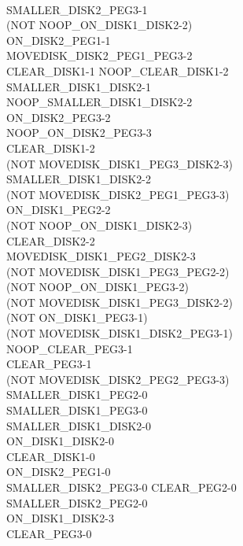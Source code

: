 \documentclass[12pt,letterpaper]{ntdhw}
\begin{document}
\begin{enumerate}
\begin{enumerate}
\\SMALLER\_DISK2\_PEG3\mbox{-}1
\\(NOT NOOP\_ON\_DISK1\_DISK2\mbox{-}2) 
\\ON\_DISK2\_PEG1\mbox{-}1 
\\MOVEDISK\_DISK2\_PEG1\_PEG3\mbox{-}2
\\CLEAR\_DISK1\mbox{-}1 NOOP\_CLEAR\_DISK1\mbox{-}2 
\\SMALLER\_DISK1\_DISK2\mbox{-}1
\\NOOP\_SMALLER\_DISK1\_DISK2\mbox{-}2 
\\ON\_DISK2\_PEG3\mbox{-}2 
\\NOOP\_ON\_DISK2\_PEG3\mbox{-}3 
\\CLEAR\_DISK1\mbox{-}2
\\(NOT MOVEDISK\_DISK1\_PEG3\_DISK2\mbox{-}3)
\\SMALLER\_DISK1\_DISK2\mbox{-}2
\\(NOT MOVEDISK\_DISK2\_PEG1\_PEG3\mbox{-}3) 
\\ON\_DISK1\_PEG2\mbox{-}2 
\\(NOT NOOP\_ON\_DISK1\_DISK2\mbox{-}3)
\\CLEAR\_DISK2\mbox{-}2 
\\MOVEDISK\_DISK1\_PEG2\_DISK2\mbox{-}3 
\\(NOT MOVEDISK\_DISK1\_PEG3\_PEG2\mbox{-}2)
\\(NOT NOOP\_ON\_DISK1\_PEG3\mbox{-}2) 
\\(NOT MOVEDISK\_DISK1\_PEG3\_DISK2\mbox{-}2)
\\(NOT ON\_DISK1\_PEG3\mbox{-}1) 
\\(NOT MOVEDISK\_DISK1\_DISK2\_PEG3\mbox{-}1) 
\\NOOP\_CLEAR\_PEG3\mbox{-}1
\\CLEAR\_PEG3\mbox{-}1 
\\(NOT MOVEDISK\_DISK2\_PEG2\_PEG3\mbox{-}3) 
\\SMALLER\_DISK1\_PEG2\mbox{-}0
\\SMALLER\_DISK1\_PEG3\mbox{-}0 
\\SMALLER\_DISK1\_DISK2\mbox{-}0 
\\ON\_DISK1\_DISK2\mbox{-}0 
\\CLEAR\_DISK1\mbox{-}0
\\ON\_DISK2\_PEG1\mbox{-}0 
\\SMALLER\_DISK2\_PEG3\mbox{-}0 CLEAR\_PEG2\mbox{-}0 
\\SMALLER\_DISK2\_PEG2\mbox{-}0
\\ON\_DISK1\_DISK2\mbox{-}3 
\\CLEAR\_PEG3\mbox{-}0 

\end{enumerate}
\end{enumerate}
\end{document}
